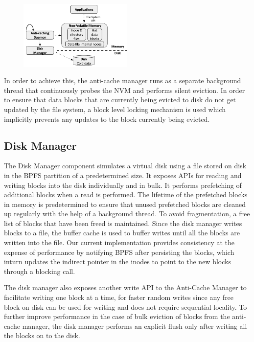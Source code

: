 \begin{figure}
\centering
\vspace{-0.2in}
\includegraphics[width=0.5\textwidth]{figs/bpfs.pdf}
\vspace{-0.2in}
\end{figure}

In order to achieve this, the anti-cache manager runs as a separate background thread that continuously probes the NVM and performs silent eviction. In order to ensure that data blocks that are currently being evicted to disk do not get updated by the file system, a block level locking mechanism is used which implicitly prevents any updates to the block currently being evicted. 

\subsection{Disk Manager}
The Disk Manager component simulates a virtual disk using a file stored on disk in the BPFS partition of a predetermined size. It exposes APIs for reading and writing blocks into the disk individually and in bulk. It performs prefetching of additional blocks when a read is performed. The lifetime of the prefetched blocks in memory is predetermined to ensure that unused prefetched blocks are cleaned up regularly with the help of a background thread. To avoid fragmentation, a free list of blocks that have been freed is maintained. Since the disk manager writes blocks to a file, the buffer cache is used to buffer writes until all the blocks are written into the file. Our current implementation provides consistency at the expense of performance by notifying BPFS after persisting the blocks, which inturn updates the indirect pointer in the inodes to point to the new blocks through a blocking call.

The disk manager also exposes another write API to the Anti-Cache Manager to facilitate writing one block at a time, for faster random writes since any free block on disk can be used for writing and does not require sequential locality. To further improve performance in the case of bulk eviction of blocks from the anti-cache manager, the disk manager performs an explicit flush only after writing all the blocks on to the disk.

